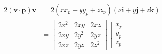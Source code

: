 $$
\begin{aligned}
2(\mathbf{v} \cdot \mathbf{p}) \mathbf{v} & =2\left(x x_{p}+y y_{p}+z z_{p}\right)(x \mathbf{i}+y \mathbf{j}+z \mathbf{k}) \\
& =\left[\begin{array}{lll}
2 x^{2} & 2 x y & 2 x z \\
2 x y & 2 y^{2} & 2 y z \\
2 x z & 2 y z & 2 z^{2}
\end{array}\right]\left[\begin{array}{l}
x_{p} \\
y_{p} \\
z_{p}
\end{array}\right] \\
\end{aligned}
$$

